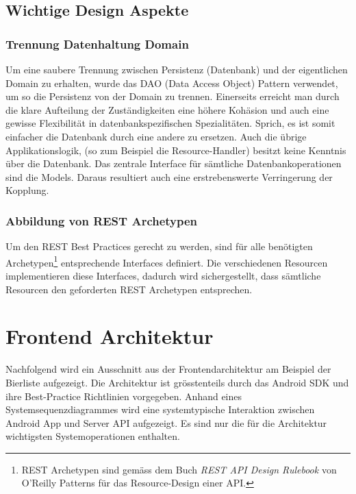 \documentclass[10pt,a4paper]{scrartcl}
\begin{document}
\subsection{Wichtige Design Aspekte}
\subsubsection*{Trennung Datenhaltung Domain}
Um eine saubere Trennung zwischen Persistenz (Datenbank) und der eigentlichen Domain zu erhalten,
wurde das DAO (Data Access Object) Pattern verwendet, um so die Persistenz von der Domain zu
trennen. Einerseits erreicht man durch die klare Aufteilung der Zuständigkeiten eine höhere
Kohäsion und auch eine gewisse Flexibilität in datenbankspezifischen Spezialitäten. Sprich, es ist
somit einfacher die Datenbank durch eine andere zu ersetzen. Auch die übrige Applikationslogik,
(so zum Beispiel die Resource-Handler) besitzt keine Kenntnis über die Datenbank. Das zentrale
Interface für sämtliche Datenbankoperationen sind die Models. Daraus resultiert auch eine
erstrebenswerte Verringerung der Kopplung.

\subsubsection*{Abbildung von REST Archetypen }
Um den REST Best Practices gerecht zu werden, sind für alle benötigten
Archetypen\footnote{REST Archetypen sind gemäss dem Buch \textit{REST API Design Rulebook} von
O'Reilly Patterns für das Resource-Design einer API.} entsprechende Interfaces definiert. Die
verschiedenen Resourcen implementieren diese Interfaces, dadurch wird sichergestellt, dass
sämtliche Resourcen den geforderten REST Archetypen entsprechen.

\newpage

\section{Frontend Architektur}
Nachfolgend wird ein Ausschnitt aus der Frontendarchitektur am Beispiel der Bierliste aufgezeigt.
Die Architektur ist grösstenteils durch das Android SDK und ihre Best-Practice Richtlinien
vorgegeben. Anhand eines Systemsequenzdiagrammes wird eine systemtypische Interaktion zwischen
Android App und Server API aufgezeigt. Es sind nur die für die Architektur wichtigsten
Systemoperationen enthalten.
\end{document}
